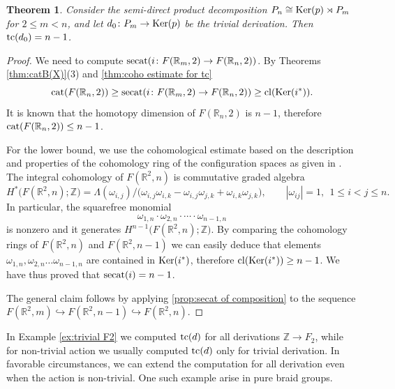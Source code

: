 \documentclass[11pt]{amsart}
\theoremstyle{plain}
\newtheorem{theorem}{Theorem}[section]
\theoremstyle{definition}
\newcommand{\ZZ}{{\mathbb{Z}}}
\newcommand{\RR}{{\mathbb{R}}}
\newcommand{\Z}{\mathbb{Z}}
\newcommand{\R}{\mathbb{R}}
\newcommand{\Ker}{\mathop{\rm Ker}\nolimits}
\newcommand{\cl}{\mathop{\rm cl}\nolimits}
\newcommand{\cat}{\mathop{\rm cat}\nolimits}
\newcommand{\secat}{\mathop{\rm secat}\nolimits}
\newcommand{\tc}{\mathop{\rm tc}\nolimits}
\begin{document}
\begin{theorem}
Consider the semi-direct product decomposition $P_n\cong \Ker(p)\rtimes P_m$ for $2\le m<n$, and let
$d_0\colon P_m\to \Ker(p)$ be the trivial derivation. Then $\tc(d_0)=n-1$.    
\end{theorem}
\begin{proof}
We need to compute $\secat(i\colon F(\RR_m,2)\to F(\RR_n,2))$. By Theorems \ref{thm:catB(X)}(3)
and \ref{thm:coho estimate for tc}
$$\cat(F(\RR_n,2))\ge \secat(i\colon F(\RR_m,2)\to F(\RR_n,2))\ge \cl(\Ker(i^*)).$$
It is known that the homotopy dimension of $F(\RR_n,2)$ is $n-1$, therefore 
$\cat(F(\RR_n,2))\le n-1$. 

For the lower bound, we use the cohomological estimate based on the description and properties 
of the cohomology ring of the configuration spaces as given in \cite[Ch. V]{FadellHusseini2001}.
The integral cohomology of $F(\R^{2},n)$ is commutative graded algebra
$$  H^{*}\!\bigl(F(\R^{2},n);\Z\bigr)
  =\Lambda(\omega_{i,j})\big/
   \bigl(\omega_{i,j}\omega_{i,k}-\omega_{i,j}\omega_{j,k}+\omega_{i,k}\omega_{j,k}\bigr),
  \qquad |\omega_{ij}|=1,\ \ 1\le i<j\le n .
$$
In particular, the squarefree monomial 
$$\omega_{1,n}\cdot\omega_{2,n}\cdot\cdots\cdot\omega_{n-1,n}$$
is nonzero and it generates $H^{n-1}\bigl(F(\R^{2},n);\Z\bigr)$.
By comparing the cohomology rings of $F(\R^{2},n)$ and $F(\R^{2},n-1)$ we can easily deduce 
that elements $\omega_{1,n},\omega_{2,n}\ldots\omega_{n-1,n}$ are contained in $\Ker(i^*)$, 
therefore $\cl(\Ker(i^*))\ge n-1$. We have thus proved that $\secat(i)=n-1$.

The general claim follows by applying \ref{prop:secat of composition} to the sequence
$F(\RR^2,m)\hookrightarrow F(\RR^2,n-1)\hookrightarrow F(\RR^2,n)$.
 \end{proof}
In Example \ref{ex:trivial F2} we computed $\tc(d)$ for all derivations $\ZZ\to F_2$, while
for non-trivial action we usually computed $\tc(d)$ only for trivial derivation. In favorable circumstances, 
we can extend the computation for all derivation even when the action is non-trivial. One such example 
arise in pure braid groups.
\end{document}
